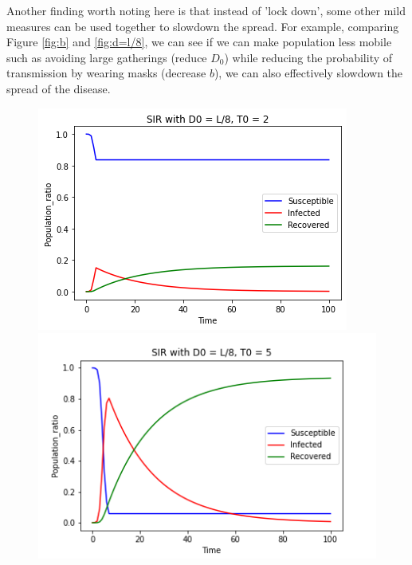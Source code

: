 \documentclass[12pt, reqno]{amsart}
\begin{document}
    Another finding worth noting here is that instead of 'lock down', some other mild measures can be used together to slowdown the spread. For example, comparing Figure \ref{fig:b} and \ref{fig:d=l/8}, we can see if we can make population less mobile such as avoiding large gatherings (reduce $D_0$) while reducing the probability of transmission by wearing masks (decrease $b$), we can also effectively slowdown the spread of the disease.
    
    \begin{figure}[h]
        \centering
        \begin{minipage}[b]{0.35 \textwidth}
            \includegraphics[width=\textwidth]{./discrete/sir_discrete_grid11.png}
            \caption{}
            \label{fig:T0=2}
        \end{minipage}
        \hfill
        \begin{minipage}[b]{0.4 \textwidth}
            \includegraphics[width=\textwidth]{./discrete/sir_discrete_grid10.png}

\end{minipage}
\end{figure}
\end{document}
